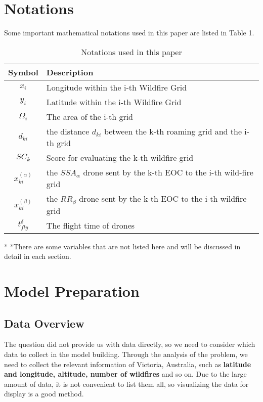 \documentclass[12pt]{article}  %
\begin{document}
 \section{Notations}
 Some important mathematical notations used in this paper are listed in Table 1. 
 \begin{table}[htbp]
 \begin{center}
 \caption{Notations used in this paper}
 \begin{tabular}{c l}
 \toprule[2pt]
 \multicolumn{1}{m{3cm}}{\centering Symbol}
 &\multicolumn{1}{m{8cm}}{\centering Description }\\
 \midrule
 $x_i$& Longitude within the i-th Wildfire Grid \\
 $y_i$& Latitude within the i-th Wildfire Grid \\
 $\varOmega _i$& The area of the i-th grid\\
 $d_{ki}$& the distance $d_{ki}$ between the k-th roaming grid and the i-th grid \\
 $SC_k$ & Score for evaluating the k-th wildfire grid \\
 \vspace{5pt}%
 $x^{( \alpha )}_{ki}$ & the $SSA_\alpha$ drone sent by the k-th EOC to the i-th wild-fire grid\\
 \vspace{3pt}
 $x^{( \beta )}_{ki}$ & the $RR_\beta$ drone sent by the k-th EOC to the i-th wildfire grid\\
 $t_{fly}^{\delta}$ & The flight time of drones\\
 \bottomrule[2pt]
 \end{tabular}\label{tb:notation}
  \begin{tablenotes}
         \footnotesize
         \item[*] *There are some variables that are not listed here and will be discussed in detail in each section. %
       \end{tablenotes}
 \end{center}
 \end{table}
 \vspace{-1cm}%
 
 \section{Model Preparation}
 \subsection{Data Overview}
 The question did not provide us with data directly, so we need to consider which data to collect in the model building. Through the analysis of the problem, we need to collect the relevant information of Victoria, Australia, such as \textbf{latitude and longitude, altitude, number of wildfires} and so on. Due to the large amount of data, it is not convenient to list them all, so visualizing the data for display is a good method.
 
\end{document}
